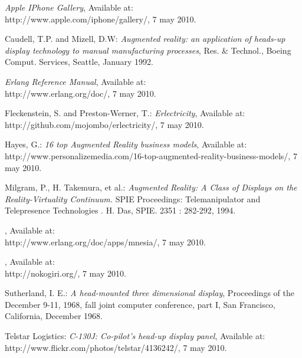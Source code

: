 \renewcommand{\bibname}{References}
\begin{thebibliography}{Abc 99}

 {\sl Apple IPhone Gallery}, Available at:\\
http://www.apple.com/iphone/gallery/, 7 may 2010.

 Caudell, T.P. and Mizell, D.W: {\sl Augmented reality: an application of heads-up display technology to manual manufacturing processes}, Res. \& Technol., Boeing Comput. Services, Seattle, January 1992.

 {\sl Erlang Reference Manual}, Available at:\\
http://www.erlang.org/doc/, 7 may 2010.

Fleckenstein, S. and Preston-Werner, T.: {\sl Erlectricity}, Available at:\\
http://github.com/mojombo/erlectricity/, 7 may 2010.

 Hayes, G.: {\sl 16 top Augmented Reality business models}, Available at:\\
http://www.personalizemedia.com/16-top-augmented-reality-business-models/, 7 may 2010.

 Milgram, P., H. Takemura, et al.: {\sl Augmented Reality: A Class of Displays on the Reality-Virtuality Continuum.} SPIE Proceedings: Telemanipulator and Telepresence Technologies . H. Das, SPIE. 2351 : 282-292, 1994.

, Available at:\\
http://www.erlang.org/doc/apps/mnesia/, 7 may 2010.

, Available at:\\
http://nokogiri.org/, 7 may 2010.

 Sutherland, I. E.: {\sl A head-mounted three dimensional display}, Proceedings of the December 9-11, 1968, fall joint computer conference, part I, San Francisco, California,  December 1968.

Telstar Logistics:  {\sl C-130J: Co-pilot's head-up display panel}, Available at:\\
http://www.flickr.com/photos/telstar/4136242/, 7 may 2010.

\end{thebibliography}
